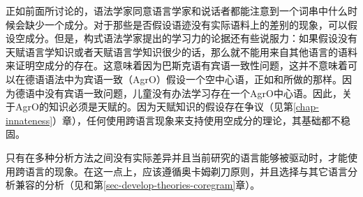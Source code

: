 正如前面所讨论的，语法学家同意语言学家和说话者都能注意到一个词串中什么时候会缺少一个成分。对于那些是否假设语迹没有实际语料上的差别的现象，可以假设空成分。但是，构式语法学家提出的学习力的论据还有些说服力：如果假设没有天赋语言学知识或者天赋语言学知识很少的话，那么就不能用来自其他语言的语料来证明空成分的存在。这意味着因为巴斯克语有宾语一致性问题，这并不意味着可以在德语语法中为宾语一致（AgrO）假设一个空中心语，正如\citet{Stechow96a}和\citet{Meinunger2000a}所做的那样。因为德语中没有宾语一致问题，儿童没有办法学习存在一个AgrO中心语。因此，关于AgrO的知识必须是天赋的。因为天赋知识的假设存在争议（见第\ref{chap-innateness}）章），任何使用跨语言现象来支持使用空成分的理论，其基础都不稳固。

只有在多种分析方法之间没有实际差异并且当前研究的语言能够被驱动时，才能使用跨语言的现象。在这一点上，应该遵循奥卡姆剃刀原则，并且选择与其它语言分析兼容的分析（见\citealp{MuellerCoreGram}和第\ref{sec-develop-theories-coregram}章）。

